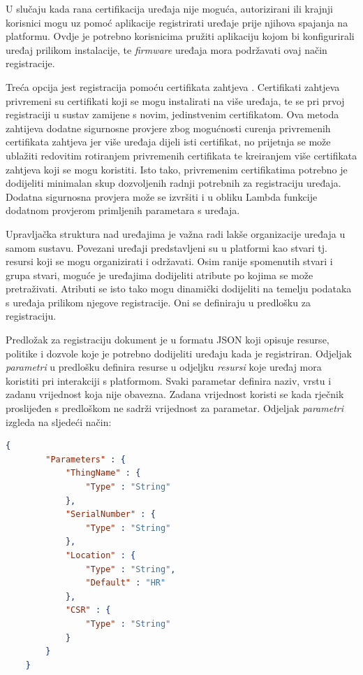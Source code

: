 U slučaju kada rana certifikacija uređaja nije moguća, autorizirani ili krajnji korisnici  mogu uz pomoć aplikacije registrirati uređaje prije njihova spajanja na platformu. Ovdje je potrebno korisnicima pružiti aplikaciju kojom bi konfigurirali uređaj prilikom instalacije, te \textit{firmware} uređaja mora podržavati ovaj način registracije. 

Treća opcija jest registracija pomoću certifikata zahtjeva . Certifikati zahtjeva privremeni su certifikati koji se mogu instalirati na više uređaja, te se pri prvoj registraciji u sustav zamijene s novim, jedinstvenim certifikatom. Ova metoda zahtijeva dodatne sigurnosne provjere zbog mogućnosti curenja privremenih certifikata zahtjeva jer više uređaja dijeli isti certifikat, no prijetnja se može ublažiti redovitim rotiranjem privremenih certifikata te kreiranjem više certifikata zahtjeva koji se mogu koristiti. Isto tako, privremenim certifikatima potrebno je dodijeliti minimalan skup dozvoljenih radnji potrebnih za registraciju uređaja. Dodatna sigurnosna provjera može se izvršiti i u obliku Lambda funkcije dodatnom provjerom primljenih parametara s uređaja.

Upravljačka struktura nad uređajima je važna radi lakše organizacije uređaja u samom sustavu. Povezani uređaji predstavljeni su u platformi kao stvari tj. resursi koji se mogu organizirati i održavati. Osim ranije spomenutih stvari i grupa stvari, moguće je uređajima dodijeliti atribute po kojima se može pretraživati. Atributi se isto tako mogu dinamički dodijeliti na temelju podataka s uređaja prilikom njegove registracije. Oni se definiraju u predlošku za registraciju. 

Predložak za registraciju dokument je u formatu JSON koji opisuje resurse, politike i dozvole koje je potrebno dodijeliti uređaju kada je registriran. Odjeljak \textit{parametri} u predlošku definira resurse u odjeljku \textit{resursi} koje uređaj mora koristiti pri interakciji s platformom. Svaki parametar definira naziv, vrstu i zadanu vrijednost koja nije obavezna. Zadana vrijednost koristi se kada rječnik proslijeđen s predloškom ne sadrži vrijednost za parametar. Odjeljak \textit{parametri} izgleda na sljedeći način:

\begin{lstlisting}[caption={Odjeljak \textit{parametri} u predlošku za registraciju}, language=json]
	{
		"Parameters" : {
			"ThingName" : {
				"Type" : "String"
			},
			"SerialNumber" : {
				"Type" : "String"
			},
			"Location" : {
				"Type" : "String",
				"Default" : "HR"
			},
			"CSR" : {
				"Type" : "String"    
			}
		}
	}
\end{lstlisting}

